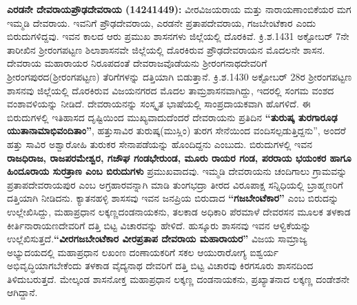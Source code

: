 \textbf{ಎರಡನೇ ದೇವರಾಯ\general{\enginline{-}}ಪ್ರೌಢದೇವರಾಯ (1424\general{\enginline{-}}1449): } ವೀರವಿಜಯರಾಯ ಮತ್ತು ನಾರಾಯಣಾಂಬಿಕೆ\-ಯರ ಮಗ ಇಮ್ಮಡಿ ದೇವರಾಯ. ಇವನಿಗೆ ಪ್ರೌಢದೇವರಾಯ, ಎರಡನೇ ಪ್ರತಾಪದೇವರಾಯ, ಗಜಬೇಂಟೆಕಾರ ಎಂದು ಬಿರುದುಗಳಿದ್ದವು. ಇವನ ಕಾಲದ ಆರು ಪ್ರಮುಖ ಶಾಸನಗಳು ಜಿಲ್ಲೆಯಲ್ಲಿ ದೊರಕಿವೆ. ಕ್ರಿ.ಶ.1431 ಅಕ್ಟೋಬರ್​ 7ನೇ ತಾರೀಖಿನ ಶ‍್ರೀರಂಗಪಟ್ಟಣ ಶಿಲಾಶಾಸನವೇ ಜಿಲ್ಲೆಯಲ್ಲಿ ದೊರಕಿರುವ ಪ್ರೌಢದೇವರಾಯನ ಮೊದಲನೇ ಶಾಸನ. ದೇವರಾಯ ಮಹಾರಾಯರ ನಿರೂಪದಂತೆ ದೇವರಾಜವೊಡೆಯನು ಶ‍್ರೀರಂಗನಾಥದೇವರಿಗೆ ಶ‍್ರೀರಂಗಪುರದ(ಶ‍್ರೀರಂಗಪಟ್ಟಣ) ತೆರಿಗೆಗಳನ್ನು ದತ್ತಿಯಾಗಿ ಬಿಡುತ್ತಾನೆ. ಕ್ರಿ.ಶ.1430 ಅಕ್ಟೋಬರ್​ 28ರ ಶ‍್ರೀರಂಗಪಟ್ಟಣ ಶಾಸನವು ಜಿಲ್ಲೆಯಲ್ಲಿ ದೊರಕಿರುವ ವಿಜಯನಗರದ ಮೊದಲ ತಾಮ್ರಶಾಸನವಾಗಿದ್ದು, ಇದರಲ್ಲಿ ಸಂಗಮ ವಂಶದ ವಂಶಾವಳಿಯನ್ನು ನೀಡಿದೆ. ದೇವರಾಯನನ್ನು ಸಂಸ್ಕೃತ ಭಾಷೆಯಲ್ಲಿ ಸಾಂಪ್ರದಾಯಕವಾಗಿ ಹೊಗಳಿದೆ. ಈ ಬಿರುದುಗಳಲ್ಲಿ ಇತಿಹಾಸದ ದೃಷ್ಟಿಯಿಂದ ಮುಖ್ಯವಾದುದೆಂದರೆ ದೇವರಾಯನು ಪ್ರತಿದಿನ \textbf{“ತುರುಷ್ಕ ತುರಗಾರೂಢ ಯುತಾನಾಮಾಭಿವಂದಿತಾಂ”}, ಹತ್ತುಸಾವಿರ ತುರುಷ್ಕ(ಮುಸ್ಲಿಂ) ತುರಗ ಸೇನೆಯಿಂದ ವಂದಿಸಲ್ಪಡುತ್ತಿದ್ದನು”, ಅಂದರೆ ಹತ್ತು ಸಾವಿರ ಅಶ್ವಾರೋಹಿ ತುರುಕರ ಸೇನಾಪಡೆಯನ್ನು ಹೊಂದಿದ್ದನು ಎಂಬುದು. ಬಿರುದುಗಳಲ್ಲಿ ಇವನ \textbf{ರಾಜಧಿರಾಜ, ರಾಜಪರಮೇಶ್ವರ, ಗಜೌಘ ಗಂಡಭೇರುಂಡ, ಮೂರು ರಾಯರ ಗಂಡ, ಪರರಾಯ ಭಯಂಕರ ಹಾಗೂ ಹಿಂದೂರಾಯ ಸುರತ್ರಾಣ ಎಂಬ ಬಿರುದುಗಳು} ಪ್ರಮುಖವಾದವು. ಇಮ್ಮಡಿ ದೇವರಾಯನು ಚಂದಿಗಾಲು ಗ್ರಾಮವನ್ನು ಪ್ರತಾಪದೇವರಾಯಪುರ ಎಂಬ ಅಗ್ರಹಾರವನ್ನಾಗಿ ಮಾಡಿ ತುಂಗಭದ್ರಾ ತೀರದ ವಿರೂಪಾಕ್ಷ ಸನ್ನಿಧಿಯಲ್ಲಿ ಬ್ರಾಹ್ಮಣರಿಗೆ ದತ್ತಿಯಾಗಿ ನೀಡಿದನು. ಕ್ಯಾತನಹಳ್ಳಿ ಶಾಸಸವು ಇವನ ಜನಪ್ರಿಯ ಬಿರುದಾದ \textbf{“ಗಜಬೇಂಟೆಕಾರ”} ಎಂಬ ಬಿರುದನ್ನು ಉಲ್ಲೇಖಿಸಿದ್ದು, ಮಹಾಪ್ರಧಾನ ಲಕ್ಕಣ್ಣದಂಡನಾಯಕನು, ತಲಕಾಡ ಅಧಿಕಾರಿ ಪೆರಮಾಳೆ ದೇವರಸನ ಮೂಲಕ ತಳಕಾಡ ಕೀರ್ತಿನಾರಾಯಣದೇವರಿಗೆ ದತ್ತಿ ಬಿಟ್ಟ ವಿಚಾರವನ್ನು ಹೇಳಿದೆ. ಹುಸ್ಕೂರು ಶಾಸನವು ಇವನ ಆಳ್ವಿಕೆಯನ್ನು ಉಲ್ಲೆಖಿಸುತ್ತದೆ.\textbf{“ವೀರಗಜಬೇಂಟೆಕಾರ ವೀರಪ್ರತಾಪ ದೇವರಾಯ ಮಹಾರಾಯರ”} ವಿಜಯ ಸಾಮ್ರಾಜ್ಯ ಅಭ್ಯುದಯದಲ್ಲಿ ಮಹಾಪ್ರಧಾನ ಲಖಂಣ ದಂಣಾಯಕರಿಗೆ ಸಕಲ ಆಯುರಾರೋಗ್ಯ ಐಶ್ವರ್ಯ ಅಭಿವೃದ್ಧಿಯಾಗಬೇಕೆಂದು ತಳಕಾಡ ವೈದ್ಯನಾಥ ದೇವರಿಗೆ ದತ್ತಿ ಬಿಟ್ಟ ವಿಚಾರವು ಕಿರಗಸೂರು ಶಾಸನದಿಂದ ತಿಳಿದುಬರುತ್ತದೆ. ಮೇಲ್ಕಂಡ ಶಾಸನೋಕ್ತ ಮಹಾಪ್ರಧಾನ ಲಕ್ಕಣ್ಣ ದಂಡನಾಯಕನು, ಪ್ರಖ್ಯಾತನಾದ ಲಕ್ಕಣ್ಣ ದಂಡೇಶನೇ ಆಗಿದ್ದಾನೆ.

